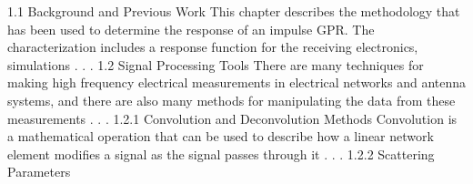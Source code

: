 \documentclass[12pt]{mines-thesis}
\begin{document}
1.1 Background and Previous Work
This chapter describes the methodology that has been used to determine the response of an impulse GPR. The characterization includes a response function for the receiving electronics, simulations . . .
1.2 Signal Processing Tools
There are many techniques for making high frequency electrical measurements in electrical networks and antenna systems, and there are also many methods for manipulating the data from these measurements . . .
1.2.1 Convolution and Deconvolution Methods
Convolution is a mathematical operation that can be used to describe how a linear network element modifies a signal as the signal passes through it . . .
1.2.2 Scattering Parameters



\end{document}
